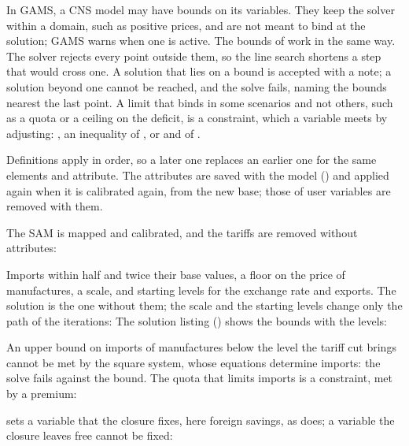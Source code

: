 

In GAMS, a CNS model may have bounds on its variables. They keep the solver
within a domain, such as positive prices, and are not meant to bind at the
solution; GAMS warns when one is active. The bounds of  work
in the same way. The solver rejects every point outside them, so the line
search shortens a step that would cross one. A solution that lies on a bound
is accepted with a note; a solution beyond one cannot be reached, and the
solve fails, naming the bounds nearest the last point. A limit that binds in
some scenarios and not others, such as a quota or a ceiling on the deficit,
is a constraint, which a variable meets by adjusting: ,
an inequality of , or  and 
of .

Definitions apply in order, so a later one replaces an earlier one for the
same elements and attribute. The attributes are saved with the model
() and applied again when it is calibrated again, from the
new base; those of user variables are removed with them.

The SAM is mapped and calibrated, and the tariffs are removed without
attributes:


Imports within half and twice their base values, a floor on the price of
manufactures, a scale, and starting levels for the exchange rate and exports.
The solution is the one without them; the scale and the starting levels
change only the path of the iterations:
The solution listing () shows the bounds with the levels:


An upper bound on imports of manufactures below the level the tariff cut
brings cannot be met by the square system, whose equations determine imports:
the solve fails against the bound. The quota that limits imports is a
constraint, met by a premium:


 sets a variable that the closure fixes, here foreign savings,
as  does; a variable the closure leaves free cannot be
fixed:

